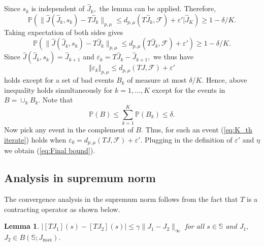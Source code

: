 \documentclass[12pt,technote,onecolumn]{IEEEtran}
\newtheorem{lemma}{Lemma}
\begin{document}
\begin{IEEEproof}
		Since $s_{k}$ is independent of $\widehat{J}_{k},$ the lemma can
		be applied. Therefore,	
		\[
		\mathbb{P}(\|\widehat{J}(\widehat{J}_{k},s_{k})-T\widehat{J}_{k}\|_{p,\mu}\leq d_{p,\mu}(T\widehat{J}_{k},\mathcal{F})+\varepsilon'\big|\widehat{J}_{K})\geq1-\delta/K.
		\]
		Taking expectation of both sides gives	
		\[
		\mathbb{P}(\|\widehat{J}(\widehat{J}_{k},s_{k})-T\widehat{J}_{k}\|_{p,\mu}\leq d_{p,\mu}(T\widehat{J}_{k},\mathcal{F})+\varepsilon')\geq1-\delta/K.
		\]
		Since $\widehat{J}(\widehat{J}_{k},s_{k})=\widehat{J}_{k+1}$
		and $\varepsilon_{k}=T\widehat{J}_{k}-\widehat{J}_{k+1},$ we thus
		have	
		$$
		\left\Vert \varepsilon_{k}\right\Vert _{p,\mu}\leq d_{p,\mu}\left(TJ,\mathcal{F}\right)+\varepsilon'
		$$
		holds except for a set of bad events $B_{k}$ of measure at most $\delta/K.$
		Hence, above inequality holds simultaneously for $k=1,\dots,K$ except
		for the events in $B=\cup_{k}B_{k}.$ Note that 	
		$$
		\mathbb{P}\left(B\right)\leq\sum_{k=1}^{K}\mathbb{P}\left(B_{k}\right)\leq\delta.
		$$	
		Now pick any event in the complement of \textbf{$B.$ }Thus, for such
		an event (\ref{eq:K_th iterate}) holds when $\varepsilon_{0}=d_{p,\mu}\left(TJ,\mathcal{F}\right)+\varepsilon'.$
		Plugging in the definition of $\varepsilon'$ and $\eta$ we obtain
		(\ref{eq:Final bound}).
\end{IEEEproof}

\subsection{Analysis in supremum norm}\label{sec6.1}

The convergence analysis in the supremum norm follows from the fact
that $T$ is a contracting operator as shown below.
\begin{lemma}
	\label{lem:Contraction} $|[TJ_{1}]\left(s\right)-[TJ_{2}]\left(s\right)|\leq\gamma\|J_{1}-J_{2}\|_{\infty}$
	for all $s\in\mathbb{S}$ and $J_{1},$ $J_{2}\in B\left(\mathbb{S};J_{\max}\right)$.
\end{lemma}
\end{document}
